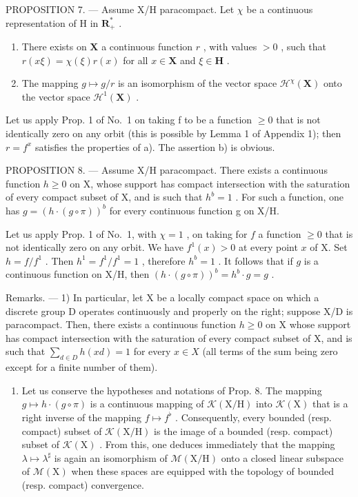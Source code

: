 PROPOSITION 7. --- Assume X/H paracompact. Let \(\chi\) be a continuous representation of H in \(\mathbf{R}_{+}^{*}\) .

\begin{enumerate}
\def\labelenumi{\alph{enumi})}
\item
  There exists on \(\mathbf{X}\) a continuous function \(r\) , with values \(>0\) , such that \(r(x\xi) = \chi (\xi)r(x)\) for all \(x\in \mathbf{X}\) and \(\xi \in \mathbf{H}\) .
\item
  The mapping \(g \mapsto g / r\) is an isomorphism of the vector space \(\mathcal{H}^{\chi}(\mathbf{X})\) onto the vector space \(\mathcal{H}^{1}(\mathbf{X})\) .
\end{enumerate}

Let us apply Prop. 1 of No.~1 on taking f to be a function \(\geqslant0\) that is not identically zero on any orbit (this is possible by Lemma 1 of Appendix 1); then \(r = f^{x}\) satisfies the properties of a). The assertion b) is obvious.

PROPOSITION 8. --- Assume X/H paracompact. There exists a continuous function \(h \geqslant 0\) on X, whose support has compact intersection with the saturation of every compact subset of X, and is such that \(h^{b}=1\) . For such a function, one has \(g=\left(h\cdot(g\circ\pi)\right)^{b}\) for every continuous function g on X/H.

Let us apply Prop. 1 of No.~1, with \(\chi = 1\) , on taking for \(f\) a function \(\geqslant 0\) that is not identically zero on any orbit. We have \(f^1(x) > 0\) at every point \(x\) of X. Set \(h = f / f^1\) . Then \(h^1 = f^1 / f^1 = 1\) , therefore \(h^b = 1\) . It follows that if \(g\) is a continuous function on X/H, then \(\left(h \cdot (g \circ \pi)\right)^b = h^b \cdot g = g\) .

Remarks. --- 1) In particular, let X be a locally compact space on which a discrete group D operates continuously and properly on the right; suppose X/D is paracompact. Then, there exists a continuous function \(h \geqslant 0\) on X whose support has compact intersection with the saturation of every compact subset of X, and is such that \(\sum_{d \in D} h(x d) = 1\) for every \(x \in X\) (all terms of the sum being zero except for a finite number of them).

\begin{enumerate}
\def\labelenumi{\arabic{enumi})}
\setcounter{enumi}{1}
\tightlist
\item
  Let us conserve the hypotheses and notations of Prop. 8. The mapping \(g \mapsto h \cdot (g \circ \pi)\) is a continuous mapping of \(\mathcal{K}(\mathrm{X / H})\) into \(\mathcal{K}(\mathrm{X})\) that is a right inverse of the mapping \(f \mapsto f^{\flat}\) . Consequently, every bounded (resp. compact) subset of \(\mathcal{K}(\mathrm{X / H})\) is the image of a bounded (resp. compact) subset of \(\mathcal{K}(\mathrm{X})\) . From this, one deduces immediately that the mapping \(\lambda \mapsto \lambda^{\sharp}\) is again an isomorphism of \(\mathcal{M}(\mathrm{X / H})\) onto a closed linear subspace of \(\mathcal{M}(\mathrm{X})\) when these spaces are equipped with the topology of bounded (resp. compact) convergence.
\end{enumerate}

